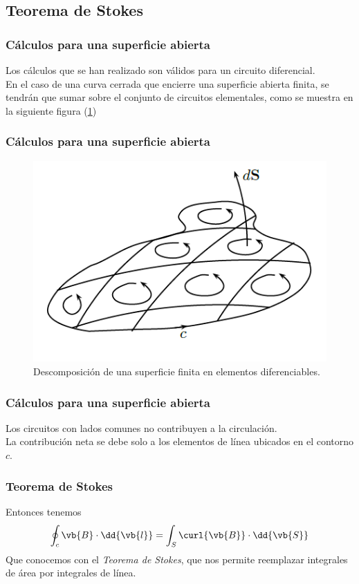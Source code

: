\subsection{Teorema de Stokes}
\begin{frame}
\frametitle{Cálculos para una superficie abierta}
Los cálculos que se han realizado son válidos para un circuito diferencial.
\\
\bigskip
En el caso de una curva cerrada que encierre una superficie abierta finita, se tendrán que sumar sobre el conjunto de circuitos elementales, como se muestra en la siguiente figura (\ref{fig:figura_superficie_elementos_diferenciables})
\end{frame}
\begin{frame}
\frametitle{Cálculos para una superficie abierta}
\begin{figure}[h!]
    \centering
    \includegraphics[scale=0.6]{Imagenes/Superficie_Elementos_Diferenciables.png}
    \caption{Descomposición de una superficie finita en elementos diferenciables.}
    \label{fig:figura_superficie_elementos_diferenciables}
\end{figure}
\end{frame}
\begin{frame}
\frametitle{Cálculos para una superficie abierta}
Los circuitos con lados comunes no contribuyen a la circulación.
\\
\bigskip
La contribución neta se debe solo a los elementos de línea ubicados en el contorno $c$.
\end{frame}
\begin{frame}
\frametitle{Teorema de Stokes}
Entonces tenemos
\begin{align}
\oint_{c} \vb{B} \cdot \dd{\vb{l}} = \int_{S} \curl{\vb{B}} \cdot \dd{\vb{S}}
\label{eq:ecuacion_01_35}
\end{align}
Que conocemos con el \emph{Teorema de Stokes}, que nos permite reemplazar integrales de área por integrales de línea.
\end{frame}

